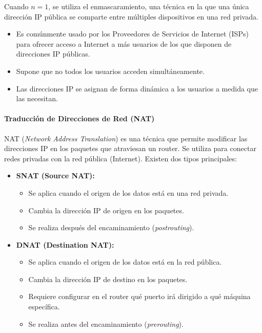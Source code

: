 \documentclass[a4paper,12pt]{article}
\begin{document}
Cuando \( n = 1 \), se utiliza el enmascaramiento, una técnica en la que una única dirección IP pública se comparte entre múltiples dispositivos en una red privada. 
\begin{itemize}
    \item Es comúnmente usado por los Proveedores de Servicios de Internet (ISPs) para ofrecer acceso a Internet a más usuarios de los que disponen de direcciones IP públicas.
    \item Supone que no todos los usuarios acceden simultáneamente.
    \item Las direcciones IP se asignan de forma dinámica a los usuarios a medida que las necesitan.
\end{itemize}

\paragraph{Traducción de Direcciones de Red (NAT)}

NAT (\textit{Network Address Translation}) es una técnica que permite modificar las direcciones IP en los paquetes que atraviesan un router. Se utiliza para conectar redes privadas con la red pública (Internet). Existen dos tipos principales:

\begin{itemize}
    \item \textbf{SNAT (Source NAT):}
    \begin{itemize}
        \item Se aplica cuando el origen de los datos está en una red privada.
        \item Cambia la dirección IP de origen en los paquetes.
        \item Se realiza después del encaminamiento (\textit{postrouting}).
    \end{itemize}

    \item \textbf{DNAT (Destination NAT):}
    \begin{itemize}
        \item Se aplica cuando el origen de los datos está en la red pública.
        \item Cambia la dirección IP de destino en los paquetes.
        \item Requiere configurar en el router qué puerto irá dirigido a qué máquina específica.
        \item Se realiza antes del encaminamiento (\textit{prerouting}).
    \end{itemize}
\end{itemize}
\end{document}
